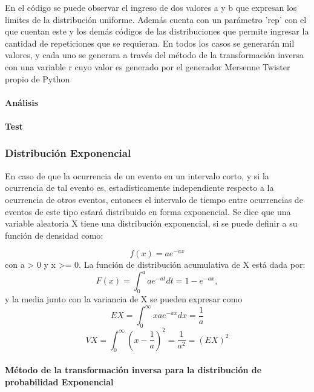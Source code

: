 \documentclass{article}
\begin{document}
  En el código se puede observar el ingreso de dos valores a y b que expresan los limites de la distribución uniforme.
  Además cuenta con un parámetro 'rep' con el que cuentan este y los demás códigos de las distribuciones que permite ingresar la cantidad de repeticiones que se requieran.
  En todos los casos se generarán mil valores, y cada uno se generara a través del método de la transformación inversa
  con una variable r cuyo valor es generado por el generador Mersenne Twister propio de Python

  \paragraph{Análisis}


  \paragraph{Test}


  \subsubsection{Distribución Exponencial}

  En caso de que la ocurrencia de un evento en un intervalo corto, y si la ocurrencia de tal evento es, estadísticamente independiente respecto a la ocurrencia de otros eventos, entonces el intervalo de tiempo entre ocurrencias de eventos de este tipo estará distribuido en forma exponencial.
  Se dice que una variable aleatoria X tiene una distribución exponencial, si se puede definir a su función de densidad como:


  \begin{equation}
    f(x) = ae^{-ax}
  \end{equation}
  con a > 0 y x >= 0.
  La función de distribución acumulativa de X está dada por:
  \begin{equation}
    F(x) = \int_{0}^{a} ae^{-at}dt = 1-e^{-ax},
  \end{equation}
  y la media junto con la variancia de X se pueden expresar como
  \begin{equation}
    EX = \int_{0}^{\infty} xae^{-ax}dx = \frac{1}{a}
  \end{equation}
  \begin{equation}
    VX = \int_{0}^{\infty} (x-\frac{1}{a})^2 = \frac{1}{a^2} = (EX)^2
  \end{equation}

  \paragraph{Método de la transformación inversa para la distribución de probabilidad Exponencial}
\end{document}
